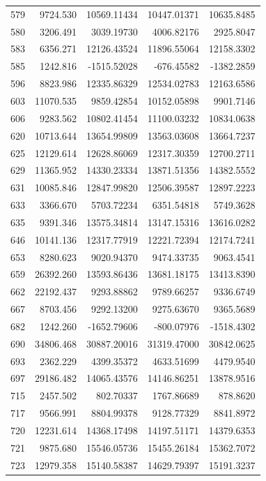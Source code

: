 \documentclass[
  12pt,
]{article}
\begin{document}
\begin{longtable}[]{@{}lrrrr@{}}
579 & 9724.530 & 10569.11434 & 10447.01371 & 10635.8485 \\
580 & 3206.491 & 3039.19730 & 4006.82176 & 2925.8047 \\
583 & 6356.271 & 12126.43524 & 11896.55064 & 12158.3302 \\
585 & 1242.816 & -1515.52028 & -676.45582 & -1382.2859 \\
596 & 8823.986 & 12335.86329 & 12534.02783 & 12163.6586 \\
603 & 11070.535 & 9859.42854 & 10152.05898 & 9901.7146 \\
606 & 9283.562 & 10802.41454 & 11100.03232 & 10834.0638 \\
620 & 10713.644 & 13654.99809 & 13563.03608 & 13664.7237 \\
625 & 12129.614 & 12628.86069 & 12317.30359 & 12700.2711 \\
629 & 11365.952 & 14330.23334 & 13871.51356 & 14382.5552 \\
631 & 10085.846 & 12847.99820 & 12506.39587 & 12897.2223 \\
633 & 3366.670 & 5703.72234 & 6351.54818 & 5749.3628 \\
635 & 9391.346 & 13575.34814 & 13147.15316 & 13616.0282 \\
646 & 10141.136 & 12317.77919 & 12221.72394 & 12174.7241 \\
653 & 8280.623 & 9020.94370 & 9474.33735 & 9063.4541 \\
659 & 26392.260 & 13593.86436 & 13681.18175 & 13413.8390 \\
662 & 22192.437 & 9293.88862 & 9789.66257 & 9336.6749 \\
667 & 8703.456 & 9292.13200 & 9275.63670 & 9365.5689 \\
682 & 1242.260 & -1652.79606 & -800.07976 & -1518.4302 \\
690 & 34806.468 & 30887.20016 & 31319.47000 & 30842.0625 \\
693 & 2362.229 & 4399.35372 & 4633.51699 & 4479.9540 \\
697 & 29186.482 & 14065.43576 & 14146.86251 & 13878.9516 \\
715 & 2457.502 & 802.70337 & 1767.86689 & 878.8620 \\
717 & 9566.991 & 8804.99378 & 9128.77329 & 8841.8972 \\
720 & 12231.614 & 14368.17498 & 14197.51171 & 14379.6353 \\
721 & 9875.680 & 15546.05736 & 15455.26184 & 15362.7072 \\
723 & 12979.358 & 15140.58387 & 14629.79397 & 15191.3237 \\

\end{longtable}
\end{document}
